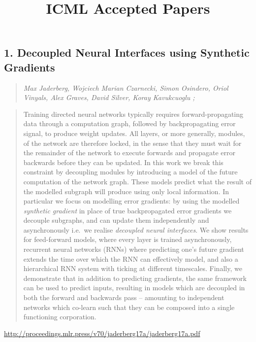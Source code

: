 \documentclass{article}
\title{\textbf{ICML Accepted Papers}}
\begin{document}
\maketitle
\tableofcontents

\subsection{1. Decoupled Neural Interfaces using Synthetic Gradients}

\begin{quote}
\footnotesize{\textit{Max Jaderberg, Wojciech Marian Czarnecki, Simon Osindero, Oriol Vinyals, Alex Graves, David Silver, Koray Kavukcuoglu ;}}
\end{quote}

\begin{quote}
    Training directed neural networks typically requires forward-propagating data through a computation graph, followed by backpropagating error signal, to produce weight updates. All layers, or more generally, modules, of the network are therefore locked, in the sense that they must wait for the remainder of the network to execute forwards and propagate error backwards before they can be updated. In this work we break this constraint by decoupling modules by introducing a model of the future computation of the network graph. These models predict what the result of the modelled subgraph will produce using only local information. In particular we focus on modelling error gradients: by using the modelled \textit{synthetic gradient} in place of true backpropagated error gradients we decouple subgraphs, and can update them independently and asynchronously i.e.\ we realise \textit{decoupled neural interfaces}. We show results for feed-forward models, where every layer is trained asynchronously, recurrent neural networks (RNNs) where predicting one’s future gradient extends the time over which the RNN can effectively model, and also a hierarchical RNN system with ticking at different timescales. Finally, we demonstrate that in addition to predicting gradients, the same framework can be used to predict inputs, resulting in models which are decoupled in both the forward and backwards pass – amounting to independent networks which co-learn such that they can be composed into a single functioning corporation.  \end{quote}

\href{http://proceedings.mlr.press/v70/jaderberg17a/jaderberg17a.pdf}{http://proceedings.mlr.press/v70/jaderberg17a/jaderberg17a.pdf}
\end{document}
